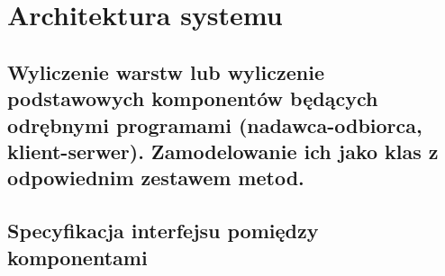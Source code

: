 \chapter{Architektura systemu}

\section{Wyliczenie warstw lub wyliczenie podstawowych komponentów będących odrębnymi programami (nadawca-odbiorca, klient-serwer). Zamodelowanie ich jako klas z odpowiednim zestawem metod.}


\section{Specyfikacja interfejsu pomiędzy komponentami}
